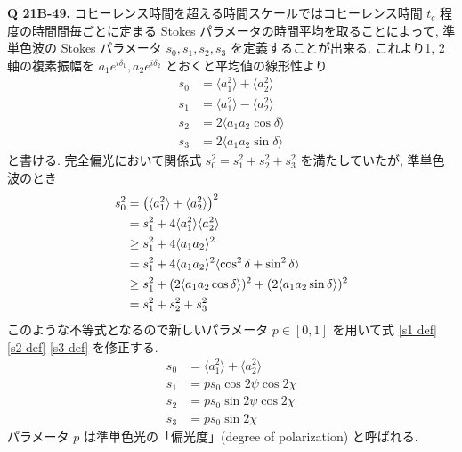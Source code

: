 \documentclass[uplatex,dvipdfmx,a4paper,11pt]{jlreq}
\theoremstyle{definition}
\begin{document}
\textbf{Q 21B-49.}
コヒーレンス時間を超える時間スケールではコヒーレンス時間 $t_c$ 程度の時間間毎ごとに定まる Stokes パラメータの時間平均を取ることによって, 準単色波の Stokes パラメータ $s_0, s_1, s_2, s_3$ を定義することが出来る. これより1, 2軸の複素振幅を $a_1e^{i\delta_1}, a_2e^{i\delta_2}$ とおくと平均値の線形性より
\begin{align}
  s_0 & = \langle a_1^2\rangle + \langle a_2^2\rangle \\
  s_1 & = \langle a_1^2\rangle - \langle a_2^2\rangle \\
  s_2 & = 2\langle a_1a_2\cos\delta\rangle            \\
  s_3 & = 2\langle a_1a_2\sin\delta\rangle
\end{align}
と書ける. 完全偏光において関係式 $s_0^2 = s_1^2 + s_2^2 + s_3^2$ を満たしていたが, 準単色波のとき
\begin{align}
  s_0^2 & = \qty(\langle a_1^2\rangle + \langle a_2^2\rangle)^2                                    \\
        & = s_1^2 + 4\langle a_1^2\rangle\langle a_2^2\rangle                                      \\
        & \geq s_1^2 + 4\langle a_1a_2\rangle^2                                                    \\
        & = s_1^2 + 4\langle a_1a_2\rangle^2\langle\cos^2\delta + \sin^2\delta\rangle              \\
        & \geq s_1^2 + (2\langle a_1a_2\cos\delta\rangle)^2 + (2\langle a_1a_2\sin\delta\rangle)^2 \\
        & = s_1^2 + s_2^2 + s_3^2
\end{align}
このような不等式となるので新しいパラメータ $p\in[0,1]$ を用いて式 \eqref{s1 def} \eqref{s2 def} \eqref{s3 def} を修正する.
\begin{align}
  s_0 & = \langle a_1^2\rangle + \langle a_2^2\rangle \\
  s_1 & = ps_0\cos2\psi\cos2\chi                      \\
  s_2 & = ps_0\sin2\psi\cos2\chi                      \\
  s_3 & = ps_0\sin2\chi
\end{align}
パラメータ $p$ は準単色光の「偏光度」(degree of polarization) と呼ばれる.
\end{document}
